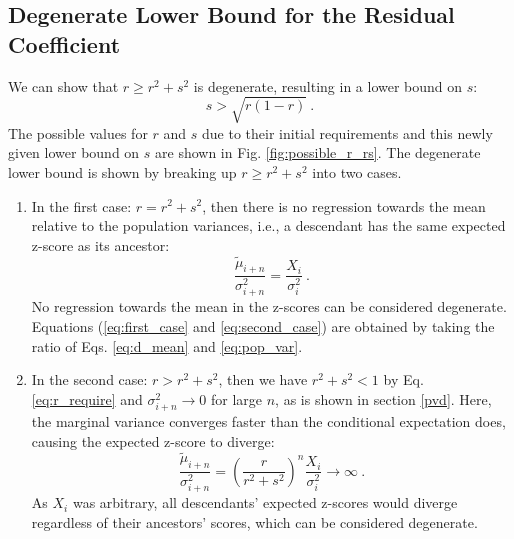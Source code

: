 \documentclass{svproc} %
\begin{document}
\subsection{Degenerate Lower Bound for the Residual Coefficient}
We can show that $r \geq r^2 + s^2$ is degenerate, resulting in a lower bound on $s$:
\begin{equation}
s > \sqrt{r(1-r)} \ .
\label{eq:lower_bound}
\end{equation}
The possible values for $r$ and $s$ due to their initial requirements and this newly given lower bound on $s$ are shown in Fig. \ref{fig:possible_r_rs}. The degenerate lower bound is shown by breaking up $r \geq r^2 + s^2$ into two cases.
\begin{enumerate}
\item In the first case: $r = r^2 + s^2$, then there is no regression towards the mean relative to the population variances, i.e., a descendant has the same expected z-score as its ancestor:
\begin{equation}
\frac{\tilde{\mu}_{i+n}}{\sigma_{i+n}^2} = \frac{X_i}{\sigma_i^2} \ .
\label{eq:first_case}
\end{equation}
No regression towards the mean in the z-scores can be considered degenerate. Equations (\ref{eq:first_case} and \ref{eq:second_case}) are obtained by taking the ratio of Eqs. \ref{eq:d_mean} and \ref{eq:pop_var}.

\item In the second case: $r > r^2 + s^2$, then we have $r^2 + s^2 < 1$ by Eq. \ref{eq:r_require} and $\sigma_{i+n}^2 \rightarrow 0$ for large $n$, as is shown in section \ref{pvd}. Here, the marginal variance converges faster than the conditional expectation does, causing the expected z-score to diverge:
\begin{equation}
\frac{\tilde{\mu}_{i+n}}{\sigma_{i+n}^2} = (\frac{r}{r^2+s^2})^n \frac{X_i}{\sigma_i^2} \rightarrow \infty \ .
\label{eq:second_case}
\end{equation}
As $X_i$ was arbitrary, all descendants' expected z-scores would diverge regardless of their ancestors' scores, which can be considered degenerate. 
\end{enumerate}
\end{document}
